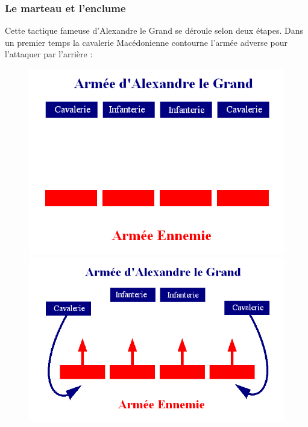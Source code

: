 \documentclass{article}
\begin{document}
\subsubsection{Le marteau et l'enclume}
Cette tactique fameuse d'Alexandre le Grand se déroule selon deux étapes. Dans un premier temps la cavalerie Macédonienne contourne l'armée adverse pour l'attaquer par l'arrière :
\begin{center}
\begin{figure}[H]
\hfill
\begin{minipage}[H]{0.5\linewidth}
	\centering
	\includegraphics[width=\linewidth]{../ressources/marteau}
\end{minipage}
\hfill
\begin{minipage}[H]{0.45\linewidth}
	\centering
	\includegraphics[width=\linewidth]{../ressources/marteau2}
\end{minipage}

\end{figure}
\end{center}
\end{document}

